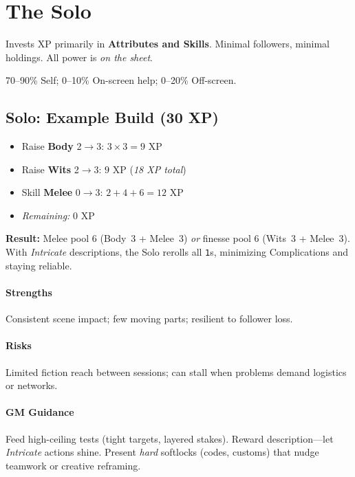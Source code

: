 \documentclass[12pt]{article}
\begin{document}
\section{The Solo}
\begin{description}[leftmargin=2cm]
  \item[Definition:] Invests XP primarily in \textbf{Attributes and Skills}. Minimal followers, minimal holdings. All power is \emph{on the sheet}.
  \item[Typical XP Spread:] 70--90\% Self; 0--10\% On-screen help; 0--20\% Off-screen.
\end{description}

\subsection*{Solo: Example Build (30 XP)}
\begin{itemize}
  \item Raise \textbf{Body} 2$\rightarrow$3: $3\times 3=9$ XP
  \item Raise \textbf{Wits} 2$\rightarrow$3: $9$ XP \hfill (\emph{18 XP total})
  \item Skill \textbf{Melee} 0$\rightarrow$3: $2+4+6=12$ XP
  \item \emph{Remaining:} 0 XP
\end{itemize}

\textbf{Result:} Melee pool 6 (Body~3 + Melee~3) \emph{or} finesse pool 6 (Wits~3 + Melee~3).  
With \emph{Intricate} descriptions, the Solo rerolls all \texttt{1}s, minimizing Complications and staying reliable.

\paragraph{Strengths} Consistent scene impact; few moving parts; resilient to follower loss.  
\paragraph{Risks} Limited fiction reach between sessions; can stall when problems demand logistics or networks.  
\paragraph{GM Guidance} Feed high-ceiling tests (tight targets, layered stakes). Reward description---let \emph{Intricate} actions shine. Present \emph{hard} softlocks (codes, customs) that nudge teamwork or creative reframing.
\end{document}
